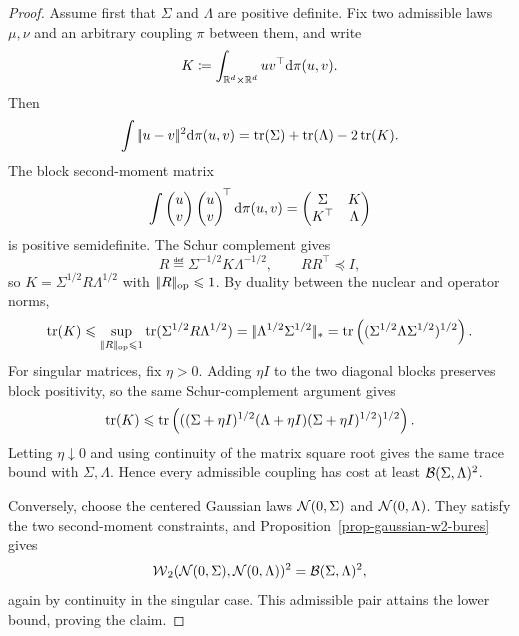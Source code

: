 \begin{proof}
	Assume first that $\Sigma$ and $\Lambda$ are positive definite. Fix two admissible laws $\mu,\nu$ and an arbitrary coupling $\pi$ between them, and write
	\[
		K\coloneqq \int_{\mathbb{R}^d\times\mathbb{R}^d}uv^\top \mathrm{d}\pi(u,v).
	\]
	Then
	\[
		\int|\!| u-v |\!|^2\mathrm{d}\pi(u,v)
		=
		\operatorname{tr}(\Sigma)+\operatorname{tr}(\Lambda)-2\operatorname{tr}(K).
	\]
	The block second-moment matrix
	\[
		\int
		\begin{pmatrix}u\\ v\end{pmatrix}
		\begin{pmatrix}u\\ v\end{pmatrix}^{\!\top}
		\mathrm{d}\pi(u,v)
		=
		\begin{pmatrix}
			\Sigma & K\\
			K^\top & \Lambda
		\end{pmatrix}
	\]
	is positive semidefinite. The Schur complement gives
	\[
		R\eqdef\Sigma^{-1/2}K\Lambda^{-1/2},
		\qquad
		RR^\top\preceq I,
	\]
	so $K=\Sigma^{1/2}R\Lambda^{1/2}$ with $|\!| R |\!|_{\mathrm{op}}\leqslant1$. By duality between the nuclear and operator norms,
	\[
		\operatorname{tr}(K)
		\leqslant
		\sup_{|\!| R |\!|_{\mathrm{op}}\leqslant1}\operatorname{tr}(\Sigma^{1/2}R\Lambda^{1/2})
		=
		|\!| \Lambda^{1/2}\Sigma^{1/2} |\!|_*
		=
		\operatorname{tr}\left( (\Sigma^{1/2}\Lambda\Sigma^{1/2})^{1/2} \right).
	\]
	For singular matrices, fix $\eta>0$. Adding $\eta I$ to the two diagonal blocks preserves block positivity, so the same Schur-complement argument gives
	\[
		\operatorname{tr}(K)
		\leqslant
		\operatorname{tr}\left( ((\Sigma+\eta I)^{1/2}(\Lambda+\eta I)(\Sigma+\eta I)^{1/2})^{1/2} \right).
	\]
	Letting $\eta\downarrow0$ and using continuity of the matrix square root gives the same trace bound with $\Sigma,\Lambda$. Hence every admissible coupling has cost at least $\mathcal{B}(\Sigma,\Lambda)^2$.

	Conversely, choose the centered Gaussian laws $\mathcal{N}(0,\Sigma)$ and $\mathcal{N}(0,\Lambda)$. They satisfy the two second-moment constraints, and Proposition~\ref{prop-gaussian-w2-bures} gives
	\[
		\operatorname{\mathcal{W}}_2(\mathcal{N}(0,\Sigma),\mathcal{N}(0,\Lambda))^2
		=
		\mathcal{B}(\Sigma,\Lambda)^2,
	\]
	again by continuity in the singular case. This admissible pair attains the lower bound, proving the claim.
\end{proof}

